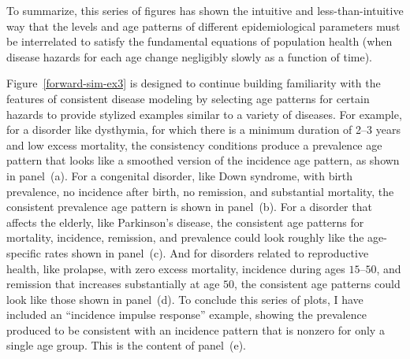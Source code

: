 To summarize, this series of figures has shown the intuitive and
less-than-intuitive way that the levels and age patterns of different
epidemiological parameters must be interrelated to satisfy the
fundamental equations of population health (when disease hazards for
each age change negligibly slowly as a function of time).

Figure~\ref{forward-sim-ex3} is designed to continue building familiarity with the
features of consistent disease modeling by selecting age patterns for
certain hazards to provide stylized examples similar to a variety of diseases.  For
example, for a disorder like dysthymia, for which there is a minimum duration of 2--3 years and low excess
mortality, the consistency conditions produce a prevalence age pattern
that looks like a smoothed version of the incidence age pattern, as shown in panel~(a).
For a congenital disorder, like Down syndrome, with birth
prevalence, no incidence after birth, no remission, and substantial
mortality, the consistent prevalence age pattern is shown in
panel~(b).
For a disorder that affects the elderly, like Parkinson's disease, the
consistent age patterns for mortality, incidence, remission, and
prevalence could look roughly like the age-specific rates shown in
panel~(c).
And for disorders related to reproductive health, like
prolapse, with zero excess mortality, incidence during ages $15$--$50$, and
remission that increases substantially at age $50$, the consistent age
patterns could look like those shown in
panel~(d).
To conclude this series of plots, I have included an ``incidence impulse
response'' example, showing the prevalence produced to be consistent
with an incidence pattern that is nonzero for only a single
age group. This is the content of
panel~(e).


